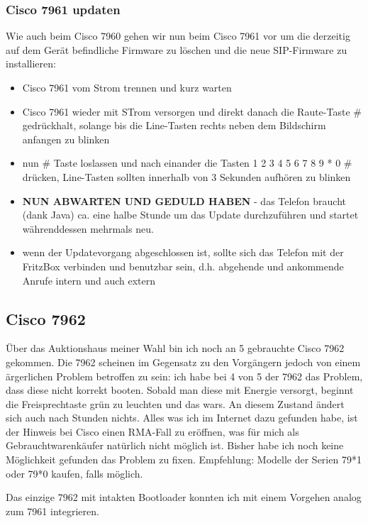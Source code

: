 \documentclass[a4paper,12pt]{scrbook}
\begin{document}
\subsubsection{Cisco 7961 updaten}
Wie auch beim Cisco 7960 gehen wir nun beim Cisco 7961 vor um die derzeitig auf dem Gerät befindliche Firmware zu löschen und die neue SIP-Firmware zu installieren:

\begin{itemize}
 \item Cisco 7961 vom Strom trennen und kurz warten 
 \item Cisco 7961 wieder mit STrom versorgen und direkt danach die Raute-Taste \# gedrückhalt, solange bis die Line-Tasten rechts neben dem Bildschirm anfangen zu blinken
 \item nun \# Taste loslassen und nach einander die Tasten 1 2 3 4 5 6 7 8 9 * 0 \# drücken, Line-Tasten sollten innerhalb von 3 Sekunden aufhören zu blinken
 \item \textbf{NUN ABWARTEN UND GEDULD HABEN} - das Telefon braucht (dank Java) ca. eine halbe Stunde um das Update durchzuführen und startet währenddessen mehrmals neu. 
 \item wenn der Updatevorgang abgeschlossen ist, sollte sich das Telefon mit der FritzBox verbinden und benutzbar sein, d.h. abgehende und ankommende Anrufe intern und auch extern
\end{itemize}

\subsection{Cisco 7962}
Über das Auktionshaus meiner Wahl bin ich noch an 5 gebrauchte Cisco 7962 gekommen. Die 7962 scheinen im Gegensatz zu den Vorgängern jedoch von einem ärgerlichen Problem betroffen zu sein:
ich habe bei 4 von 5 der 7962 das Problem, dass diese nicht korrekt booten. Sobald man diese mit Energie versorgt, beginnt die Freisprechtaste grün zu leuchten und das wars.
An diesem Zustand ändert sich auch nach Stunden nichts. Alles was ich im Internet dazu gefunden habe, ist der Hinweis bei Cisco einen RMA-Fall zu eröffnen, was für mich als Gebrauchtwarenkäufer
natürlich nicht möglich ist. Bisher habe ich noch keine Möglichkeit gefunden das Problem zu fixen. Empfehlung: Modelle der Serien 79*1 oder 79*0 kaufen, falls möglich.

Das einzige 7962 mit intakten Bootloader konnten ich mit einem Vorgehen analog zum 7961 integrieren.
\end{document}
